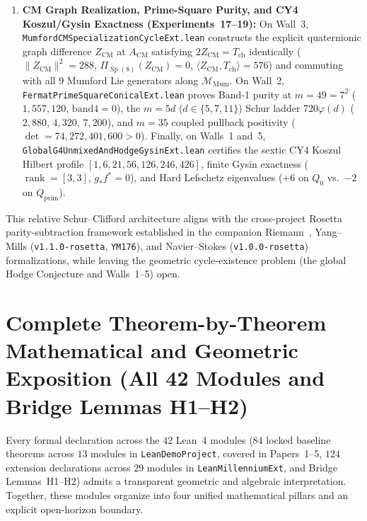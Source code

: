\documentclass[11pt,a4paper]{article}
\begin{document}
\begin{enumerate}
  \item \textbf{CM Graph Realization, Prime-Square Purity, and CY4 Koszul/Gysin Exactness (Experiments~17--19):} On Wall~3, {\small\texttt{Mumford\allowbreak{}CM\allowbreak{}Specialization\allowbreak{}Cycle\allowbreak{}Ext.lean}} constructs the explicit quaternionic graph difference $Z_{\mathrm{CM}}$ at $A_{\mathrm{CM}}$ satisfying $2 Z_{\mathrm{CM}} = T_{\mathrm{ch}}$ identically ($\|Z_{\mathrm{CM}}\|^2 = 288$, $\Pi_{\operatorname{Sp}(8)}(Z_{\mathrm{CM}}) = 0$, $\langle Z_{\mathrm{CM}}, T_{\mathrm{ch}}\rangle = 576$) and commuting with all $9$ Mumford Lie generators along $\mathcal{M}_{\mathrm{Mum}}$. On Wall~2, {\small\texttt{Fermat\allowbreak{}Prime\allowbreak{}Square\allowbreak{}Conical\allowbreak{}Ext.lean}} proves Band-1 purity at $m = 49 = 7^2$ ($1{,}557{,}120$, $\mathrm{band4} = 0$), the $m = 5d$ ($d \in \{5,7,11\}$) Schur ladder $720\varphi(d)$ ($2{,}880$, $4{,}320$, $7{,}200$), and $m = 35$ coupled pullback positivity ($\det = 74{,}272{,}401{,}600 > 0$). Finally, on Walls~1 and~5, {\small\texttt{Global\allowbreak{}G4\allowbreak{}Unmixed\allowbreak{}And\allowbreak{}Hodge\allowbreak{}Gysin\allowbreak{}Ext.lean}} certifies the sextic CY4 Koszul Hilbert profile $[1, 6, 21, 56, 126, 246, 426]$, finite Gysin exactness ($\operatorname{rank} = [3, 3]$, $g_* f^* = 0$), and Hard Lefschetz eigenvalues ($+6$ on $Q_0$ vs.\ $-2$ on $Q_{\mathrm{prim}}$).
\end{enumerate}
This relative Schur--Clifford architecture aligns with the cross-project Rosetta parity-subtraction framework established in the companion Riemann~\cite{RosettaRiemann2026}, Yang--Mills (\texttt{v1.1.0-rosetta}, \texttt{YM176}), and Navier--Stokes (\texttt{v1.0.0-rosetta}) formalizations, while leaving the geometric cycle-existence problem (the global Hodge Conjecture and Walls~1--5) open.

\section{Complete Theorem-by-Theorem Mathematical and Geometric Exposition (All 42 Modules and Bridge Lemmas H1--H2)}
\label{sec:complete_exposition}

Every formal declaration across the $42$ Lean~4 modules ($84$ locked baseline theorems across $13$ modules in \texttt{LeanDemoProject}, covered in Papers~1--5, $124$ extension declarations across $29$ modules in \texttt{LeanMillenniumExt}, and Bridge Lemmas~H1--H2) admits a transparent geometric and algebraic interpretation. Together, these modules organize into four unified mathematical pillars and an explicit open-horizon boundary.
\end{document}
